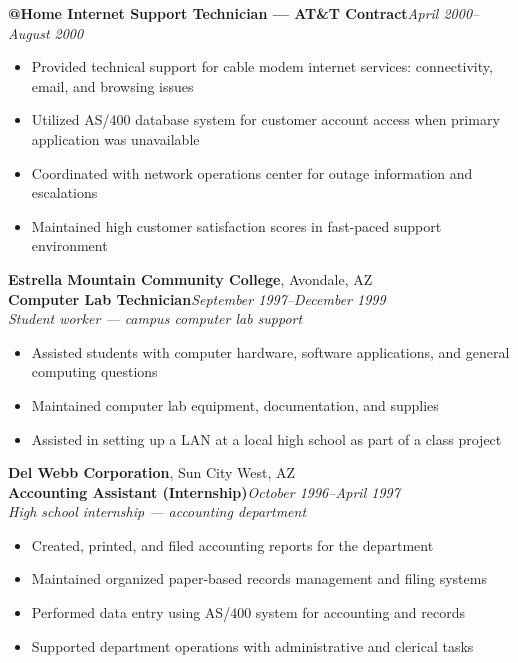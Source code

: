 \documentclass[9pt,letterpaper]{extarticle}
\begin{document}
\textbf{@Home Internet Support Technician --- AT\&T Contract}\hfill\textit{April 2000--August 2000}
\begin{itemize}
  \item Provided technical support for cable modem internet services: connectivity, email, and browsing issues
  \item Utilized AS/400 database system for customer account access when primary application was unavailable
  \item Coordinated with network operations center for outage information and escalations
  \item Maintained high customer satisfaction scores in fast-paced support environment
\end{itemize}

\newpage
\noindent\textbf{Estrella Mountain Community College}, Avondale, AZ\\
\textbf{Computer Lab Technician}\hfill\textit{September 1997--December 1999}\\
\textit{Student worker --- campus computer lab support}
\begin{itemize}
  \item Assisted students with computer hardware, software applications, and general computing questions
  \item Maintained computer lab equipment, documentation, and supplies
  \item Assisted in setting up a LAN at a local high school as part of a class project
\end{itemize}

\vspace{5pt}
\noindent\textbf{Del Webb Corporation}, Sun City West, AZ\\
\textbf{Accounting Assistant (Internship)}\hfill\textit{October 1996--April 1997}\\
\textit{High school internship --- accounting department}
\nopagebreak
\begin{itemize}
  \item Created, printed, and filed accounting reports for the department
  \item Maintained organized paper-based records management and filing systems
  \item Performed data entry using AS/400 system for accounting and records
  \item Supported department operations with administrative and clerical tasks
\end{itemize}
\end{document}
